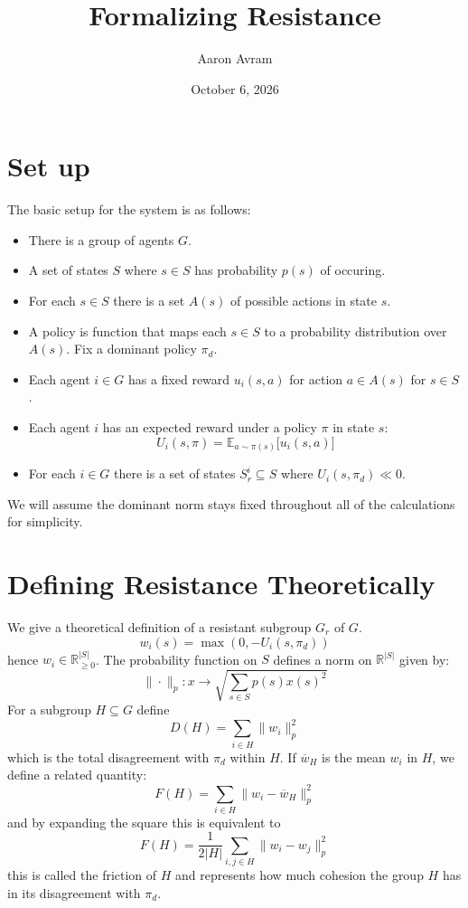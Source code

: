 \documentclass[11pt]{article}
\title{Formalizing Resistance}
\author{Aaron Avram}
\date{October 6, 2026}
\theoremstyle{definition}
\theoremstyle{remark}
\begin{document}
\maketitle

\section{Set up}
The basic setup for the system is as follows:
\begin{itemize}
    \item There is a group of agents $G$.
    \item A set of states $S$ where $s \in S$ has probability $p(s)$ of occuring.
    \item For each $s \in S$ there is a set $A(s)$ of possible actions in state $s$.
    \item A policy is function that maps each $s \in S$ to a probability distribution over $A(s)$.
    Fix a dominant policy $\pi_d$.
    \item Each agent $i \in G$ has a fixed reward $u_i(s, a)$ for action $a \in A(s)$ for $s \in S$.
    \item Each agent $i$ has an expected reward under a policy $\pi$ in state $s$:
    \[ U_i(s, \pi) = \mathbb E_{a \sim \pi(s)}\Big[u_i(s, a)\Big] \]
    \item For each $i \in G$ there is a set of states $S_r^i \subseteq S$ where $U_i(s, \pi_d) \ll 0$.
\end{itemize}
We will assume the dominant norm stays fixed throughout all of the calculations for simplicity.

\section{Defining Resistance Theoretically}
We give a theoretical definition of a resistant subgroup $G_r$ of $G$.
\[ w_i(s) = \max(0, -U_i(s, \pi_d)) \]
hence $w_i \in \mathbb R^{|S|}_{\geq 0}$.
The probability function on $S$ defines a norm on $\mathbb R^{|S|}$ given by:
\[ \| \cdot \|_p: x \to \sqrt{\sum_{s \in S}p(s)x(s)^2} \]
For a subgroup $H \subseteq G$ define
\[ D(H) = \sum_{i \in H} \| w_i \|_p^2 \]
which is the total disagreement with $\pi_d$ within $H$.
If $\overline{w}_H$ is the mean $w_i$ in $H$, we define a related quantity:
\[ F(H) = \sum_{i \in H}\| w_i -\overline{w}_H \|_p^2 \]
and by expanding the square this is equivalent to
\[ F(H) = \frac{1}{2|H|}\sum_{i, j \in H}\| w_i - w_j \|^2_p \]
this is called the friction of $H$ and represents how much cohesion the group $H$
has in its disagreement with $\pi_d$.
\end{document}

